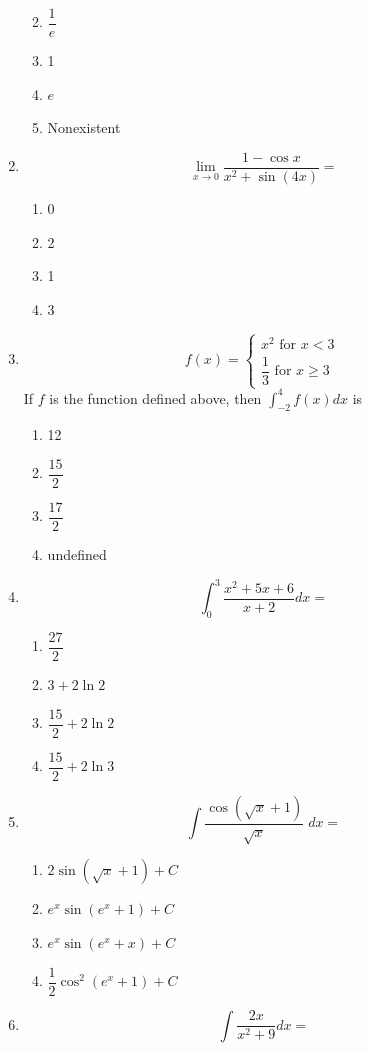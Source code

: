 \documentclass[12pt
]{article}
\providecommand{\tightlist}{%
  \setlength{\itemsep}{0pt}\setlength{\parskip}{0pt}}
\def\tightlist{}
\begin{document}
\begin{enumerate}
  \begin{enumerate}
  \def\labelenumii{\alph{enumii}.}
  \tightlist
  \item
    \(\dfrac{1}{e}\)
  \item
    1
  \item
    \(e\)
  \item
    Nonexistent
  \end{enumerate}
\item
  \[\lim_{x \rightarrow 0}\dfrac{1 - \cos x}{x^{2} + \sin(4x)} =\]

  \begin{enumerate}
  \def\labelenumii{\alph{enumii}.}
  \tightlist
  \item
    0
  \item
    2
  \item
    1
  \item
    3
  \end{enumerate}
\item
  \[f(x) = \left\{ \begin{matrix}
  x^2\text{ for }x < 3 \\
  \dfrac{1}{3}\text{ for }x \geq 3
  \end{matrix} \right.\ \] If \(f\) is the function defined above, then
  \(\displaystyle \int_{- 2}^{4}f(x)dx\) is

  \begin{enumerate}
  \def\labelenumii{\alph{enumii}.}
  \tightlist
  \item
    12
  \item
    \(\dfrac{15}{2}\)
  \item
    \(\dfrac{17}{2}\)
  \item
    undefined
  \end{enumerate}
\item
  \[\displaystyle \int_{0}^{3}\dfrac{x^{2} + 5x + 6}{x + 2}dx =\]

  \begin{enumerate}
  \def\labelenumii{\alph{enumii}.}
  \tightlist
  \item
    \(\dfrac{27}{2}\)
  \item
    \(3 + 2\ln 2\)
  \item
    \(\dfrac{15}{2} + 2\ln 2\)
  \item
    \(\dfrac{15}{2} + 2\ln 3\)
  \end{enumerate}
\item
  \[\displaystyle \int \dfrac{\cos{\left(\sqrt{x} + 1\right)}}{\sqrt x}\; dx =\]

  \begin{enumerate}
  \def\labelenumii{\alph{enumii}.}
  \tightlist
  \item
    \(2\sin \left(\sqrt{x} + 1\right) + C\)
  \item
    \(e^{x}\sin\left( e^{x} + 1 \right) + C\)
  \item
    \(e^{x}\sin\left( e^{x} + x \right) + C\)
  \item
    \(\dfrac{1}{2}\cos^{2}\left( e^{x} + 1 \right) + C\)
  \end{enumerate}
\item
  \[\displaystyle \int\dfrac{2x}{x^{2} + 9}dx =\]


\end{enumerate}
\end{document}
